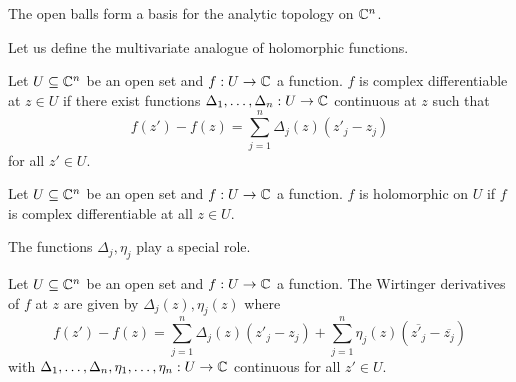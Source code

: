 \begin{remark}
    The open balls form a basis for the analytic topology on $\mathbb{C}^{n}$. 
\end{remark}
Let us define the multivariate analogue of holomorphic functions. 
\begin{definition}\label{def: complex differentiable function}
    Let $U\subseteq\mathbb{C}^{n}$ be an open set and $f:U\to \mathbb{C}$ a function. $f$ is complex differentiable at $z\in U$ if there exist functions $\Delta_{1},\dots,\Delta_{n}:U\to\mathbb{C}$ continuous at $z$ such that 
    $$f(z')-f(z)=\sum_{j=1}^{n}\Delta_{j}(z)(z'_{j}-z_{j})$$
    for all $z'\in U$. 
\end{definition}
\begin{definition}\label{def: holomorphic function}
    Let $U\subseteq\mathbb{C}^{n}$ be an open set and $f:U\to \mathbb{C}$ a function. $f$ is holomorphic on $U$ if $f$ is complex differentiable at all $z\in U$. 
\end{definition}
The functions $\Delta_{j},\eta_{j}$ play a special role. 
\begin{definition}\label{def: Wirtinger derivatives}
    Let $U\subseteq\mathbb{C}^{n}$ be an open set and $f:U\to \mathbb{C}$ a function. The Wirtinger derivatives of $f$ at $z$ are given by $\Delta_{j}(z),\eta_{j}(z)$ where 
    $$f(z')-f(z)=\sum_{j=1}^{n}\Delta_{j}(z)(z'_{j}-z_{j})+\sum_{j=1}^{n}\eta_{j}(z)(\overline{z'_{j}}-\overline{z_{j}})$$
    with $\Delta_{1},\dots,\Delta_{n},\eta_{1},\dots,\eta_{n}:U\to\mathbb{C}$ continuous for all $z'\in U$.
\end{definition}